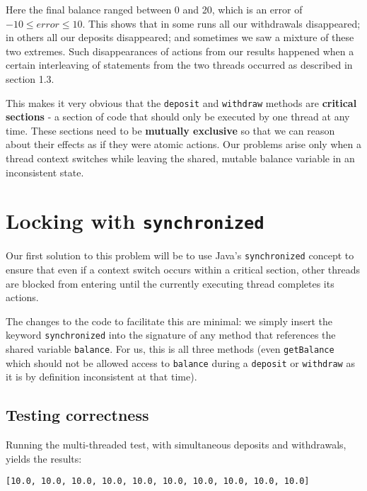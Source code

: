\documentclass[a4paper,12pt]{kth-mag}
\begin{document}
Here the final balance ranged between 0 and 20, which is an error of $-10 \leq error \leq 10$. This shows that in some runs all our withdrawals disappeared; in others all our deposits disappeared; and sometimes we saw a mixture of these two extremes. Such disappearances of actions from our results happened when a certain interleaving of statements from the two threads occurred as described in section 1.3.

This makes it very obvious that the \texttt{deposit} and \texttt{withdraw} methods are \textbf{critical sections} - a section of code that should only be executed by one thread at any time. These sections need to be \textbf{mutually exclusive} so that we can reason about their effects as if they were atomic actions. Our problems arise only when a thread context switches while leaving the shared, mutable balance variable in an inconsistent state. 

\section{Locking with \texttt{synchronized}}

Our first solution to this problem will be to use Java's \texttt{synchronized} concept to ensure that even if a context switch occurs within a critical section, other threads are blocked from entering until the currently executing thread completes its actions.

The changes to the code to facilitate this are minimal: we simply insert the keyword \texttt{synchronized} into the signature of any method that references the shared variable \texttt{balance}. For us, this is all three methods (even \texttt{getBalance} which should not be allowed access to \texttt{balance} during a \texttt{deposit} or \texttt{withdraw} as it is by definition inconsistent at that time).

\subsection{Testing correctness}

Running the multi-threaded test, with simultaneous deposits and withdrawals, yields the results:

\begin{listing}[H]
	\begin{verbatim}
[10.0, 10.0, 10.0, 10.0, 10.0, 10.0, 10.0, 10.0, 10.0, 10.0] 
	\end{verbatim}
\end{listing}
\end{document}
